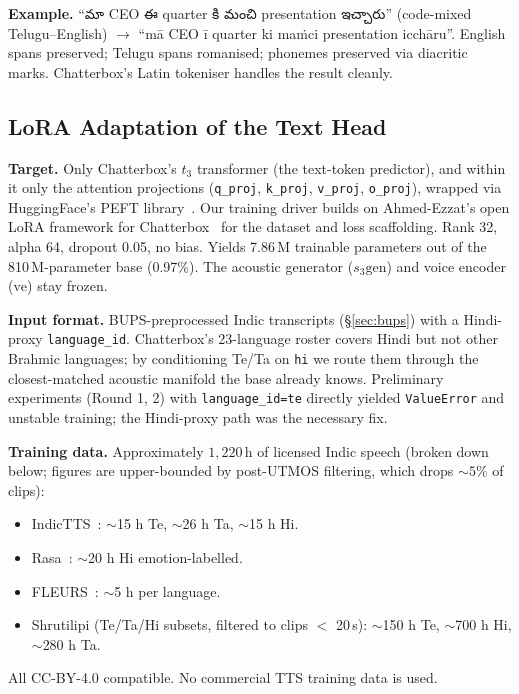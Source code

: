 \documentclass[conference,a4paper]{IEEEtran}
\newcommand{\textte}[1]{{\telugufont #1}}
\begin{document}
\textbf{Example.} ``\textte{మా} CEO \textte{ఈ} quarter \textte{కి మంచి} presentation \textte{ఇచ్చారు}'' (code-mixed Telugu--English) $\to$ ``mā CEO ī quarter ki maṁci presentation icchāru''. English spans preserved; Telugu spans romanised; phonemes preserved via diacritic marks. Chatterbox's Latin tokeniser handles the result cleanly.

\subsection{LoRA Adaptation of the Text Head}
\label{sec:lora}

\textbf{Target.} Only Chatterbox's $t_3$ transformer (the text-token predictor), and within it only the attention projections (\texttt{q\_proj}, \texttt{k\_proj}, \texttt{v\_proj}, \texttt{o\_proj}), wrapped via HuggingFace's PEFT library~\cite{peft}. Our training driver builds on Ahmed-Ezzat's open LoRA framework for Chatterbox~\cite{chatterbox_ft_ahmed} for the dataset and loss scaffolding. Rank 32, alpha 64, dropout 0.05, no bias. Yields 7.86\,M trainable parameters out of the 810\,M-parameter base (0.97\%). The acoustic generator ($s_3\text{gen}$) and voice encoder ($\text{ve}$) stay frozen.

\textbf{Input format.} BUPS-preprocessed Indic transcripts (§\ref{sec:bups}) with a Hindi-proxy \texttt{language\_id}. Chatterbox's 23-language roster covers Hindi but not other Brahmic languages; by conditioning Te/Ta on \texttt{hi} we route them through the closest-matched acoustic manifold the base already knows. Preliminary experiments (Round 1, 2) with \texttt{language\_id=te} directly yielded \texttt{ValueError} and unstable training; the Hindi-proxy path was the necessary fix.

\textbf{Training data.} Approximately $1{,}220$\,h of licensed Indic speech (broken down below; figures are upper-bounded by post-UTMOS filtering, which drops ${\sim}5\%$ of clips):
\begin{itemize}
  \item IndicTTS~\cite{indictts2022}: $\sim$15 h Te, $\sim$26 h Ta, $\sim$15 h Hi.
  \item Rasa~\cite{ai4bharat2023rasa}: $\sim$20 h Hi emotion-labelled.
  \item FLEURS~\cite{conneau2022fleurs}: $\sim$5 h per language.
  \item Shrutilipi (Te/Ta/Hi subsets, filtered to clips $<$ 20\,s): $\sim$150 h Te, $\sim$700 h Hi, $\sim$280 h Ta.
\end{itemize}
All CC-BY-4.0 compatible. No commercial TTS training data is used.
\end{document}
